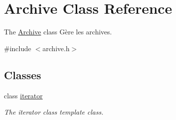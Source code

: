 \hypertarget{class_archive}{}\section{Archive Class Reference}
\label{class_archive}


The \hyperlink{class_archive}{Archive} class Gère les archives.  




{\ttfamily \#include $<$archive.\+h$>$}

\subsection*{Classes}
\begin{DoxyCompactItemize}
\item 
class \hyperlink{class_archive_1_1iterator}{iterator}
\begin{DoxyCompactList}\small\item\em The iterator class template class. \end{DoxyCompactList}\end{DoxyCompactItemize}
